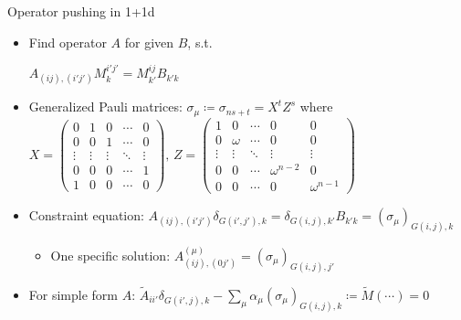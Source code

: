 \documentclass{fdubeamer}
\newcommand{\tikzinput}[1]{}
\newcommand{\1}{\mathbb{1}}
\begin{document}
\begin{frame}{Operator pushing in 1+1d}

\linespread{1.4}
\selectfont

\begin{itemize}
  \item Find operator $A$ for given $B$, s.t. \\[0.8ex]
    \mbox{\qquad}
    \begingroup
      \scriptsize
      \tikzset{x=1em, y=1em, node font=\tiny}
      \tikzinput{operator-pushing/constraint-1+1d}
    \endgroup
    \quad\textrightarrow\quad
    $A_{(ij), (i'j')} M^{i'j'}_{ k} = M^{ij}_{k'} B_{k'k}$
  \item Generalized Pauli matrices: $\sigma_\mu \coloneq \sigma_{ns+t} = X^t Z^s$ where \\[1ex]
    \mbox{\qquad}
    $
      X = \left( \begin{smallmatrix}
        0      & 1      & 0      & \cdots & 0      \\
        0      & 0      & 1      & \cdots & 0      \\
        \vdots & \vdots & \vdots & \ddots & \vdots \\
        0      & 0      & 0      & \cdots & 1      \\
        1      & 0      & 0      & \cdots & 0
      \end{smallmatrix} \right)\!, \,
      Z = \left( \begin{smallmatrix}
        1      & 0      & \cdots & 0            & 0      \\
        0      & \omega & \cdots & 0            & 0      \\
        \vdots & \vdots & \ddots & \vdots       & \vdots \\
        0      & 0      & \cdots & \omega^{n-2} & 0      \\
        0      & 0      & \cdots & 0            & \omega^{n-1}
      \end{smallmatrix} \right)
    $
    \vspace{0.5ex}
  \item Constraint equation: $A_{(ij), (i'j')} \delta_{G(i',j'), k} = \delta_{G(i,j), k'} B_{k'k} = (\sigma_\mu)_{G(i,j), k}$

    \begin{itemize}
      \item One specific solution: $A^{(\mu)}_{(ij), (0j')} = (\sigma_\mu)_{G(i,j), j'}$
    \end{itemize}

  \item For simple form $A$: $\tilde{A}_{ii'} \delta_{G(i',j), k} - \sum_\mu \alpha_\mu (\sigma_\mu)_{G(i,j), k} \coloneq \tilde{M}(\cdots) = 0$
\end{itemize}

\end{frame}
\end{document}
